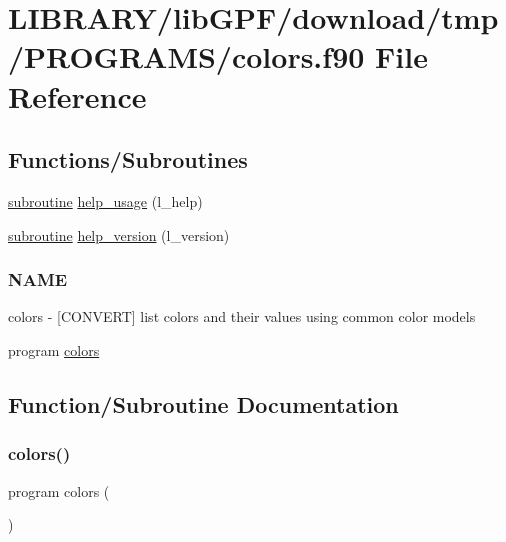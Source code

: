 \hypertarget{colors_8f90}{}\section{L\+I\+B\+R\+A\+R\+Y/lib\+G\+P\+F/download/tmp/\+P\+R\+O\+G\+R\+A\+M\+S/colors.f90 File Reference}
\label{colors_8f90}
\subsection*{Functions/\+Subroutines}
\begin{DoxyCompactItemize}
\item 
\hyperlink{M__stopwatch_83_8txt_acfbcff50169d691ff02d4a123ed70482}{subroutine} \hyperlink{colors_8f90_a3e09a3b52ee8fb04eeb93fe5761626a8}{help\+\_\+usage} (l\+\_\+help)
\item 
\hyperlink{M__stopwatch_83_8txt_acfbcff50169d691ff02d4a123ed70482}{subroutine} \hyperlink{colors_8f90_a39c21619b08a3c22f19e2306efd7f766}{help\+\_\+version} (l\+\_\+version)
\begin{DoxyCompactList}\small\item\em \subsubsection*{N\+A\+ME}

colors -\/ \mbox{[}C\+O\+N\+V\+E\+RT\mbox{]} list colors and their values using common color models \end{DoxyCompactList}\item 
program \hyperlink{colors_8f90_a147ff2bc384cd71c5234499e7a85bada}{colors}
\end{DoxyCompactItemize}


\subsection{Function/\+Subroutine Documentation}
\mbox{\label{colors_8f90_a147ff2bc384cd71c5234499e7a85bada}} 
\subsubsection{\texorpdfstring{colors()}{colors()}}
{\footnotesize\ttfamily program colors (\begin{DoxyParamCaption}{ }\end{DoxyParamCaption})}



